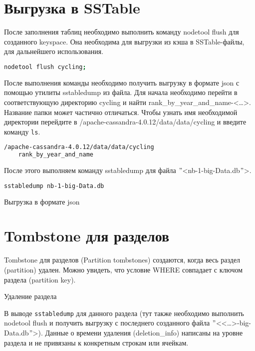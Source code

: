 \section{Выгрузка в SSTable}

После заполнения таблиц необходимо выполнить команду nodetool
flush для созданного keyspace. Она необходима для выгрузки из кэша в
SSTable-файлы, для дальнейшего использования.

\begin{lstlisting}[language=bash]
nodetool flush cycling;
\end{lstlisting}

После выполнения команды необходимо получить выгрузку в формате
json с помощью утилиты sstabledump из файла. Для начала необходимо перейти
в соответствующую директорию cycling и найти rank\_by\_year\_and\_name-<\ldots>.
Название папки может частично отличаться.
Чтобы узнать имя необходимой директории перейдите
в /apache-cassandra-4.0.12/data/data/cycling и введите команду \texttt{ls}.

\begin{lstlisting}[language=bash]
/apache-cassandra-4.0.12/data/data/cycling
	rank_by_year_and_name
\end{lstlisting}

После этого выполняем команду sstabledump для файла \("\)<nb-1-big-Data.db\("\)>.

\begin{lstlisting}[language=bash]
sstabledump nb-1-big-Data.db
\end{lstlisting}

\begin{image}
	\caption{Выгрузка в формате json}
	\label{fig:sstabledump:json}
\end{image}

\section{Tombstone для разделов}

Tombstone для разделов (Partition tombstones) создаются, когда весь
раздел (partition) удален. Можно увидеть, что условие WHERE совпадает с
ключом раздела (partition key).

\begin{image}
	\caption{Удаление раздела}
	\label{fig:cqlsh:partition:delete}
\end{image}

В выводе \texttt{sstabledump} для данного раздела (тут также необходимо
выполнить nodetool flush и получить выгрузку с последнего созданного
файла \("\)<<\ldots>-big-Data.db\("\)>).
Данные о времени удаления (deletion\_info)
написаны на уровне раздела и не привязаны к конкретным строкам или
ячейкам.

